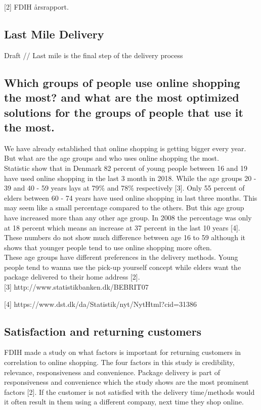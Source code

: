 \documentclass[12pt]{report}
\begin{document}
[2] FDIH årsrapport.

\subsection{Last Mile Delivery }
Draft //
Last mile is the final step of the delivery process



\subsection{Which groups of people use online shopping the most? and what are the most optimized solutions for the groups of people that use it the most.}
We have already established that online shopping is getting bigger every year. But what are the age groups and who uses online shopping the most. \\
Statistic show that in Denmark 82 percent of young people between 16 and 19 have used online shopping in the last 3 month in 2018. While the age groups 20 - 39 and 40 - 59 years lays at 79\% and 78\% respectively [3]. Only 55 percent of elders between 60 - 74 years have used online shopping in last three months. This may seem like a small percentage compared to the others. But this age group have increased more than any other age group. In 2008 the percentage was only at 18 percent which means an increase at 37 percent in the last 10 years [4]. \\
These numbers do not show much difference between age 16 to 59 although it shows that younger people tend to use online shopping more often. \\
These age groups have different preferences in the delivery methods. Young people tend to wanna use the pick-up yourself concept while elders want the package delivered to their home address [2]. \\

[3] http://www.statistikbanken.dk/BEBRIT07

[4] https://www.dst.dk/da/Statistik/nyt/NytHtml?cid=31386


\subsection{Satisfaction and returning customers}
FDIH made a study on what factors is important for returning customers in correlation to online shopping. The four factors in this study is credibility, relevance, responsiveness and convenience. Package delivery is part of responsiveness and convenience which the study shows are the most prominent factors [2]. If the customer is not satisfied with the delivery time/methods would it often result in them using a different company, next time they shop online.
\end{document}
